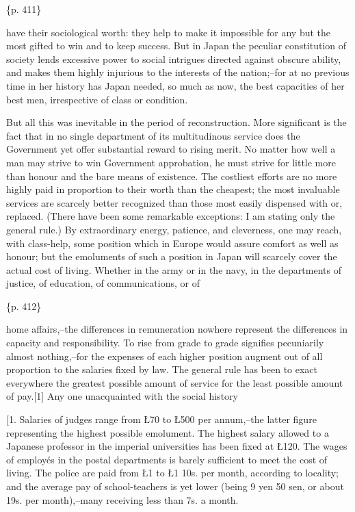 \{p. 411\}

have their sociological worth: they help to make it impossible for any but the most gifted to win and to keep success. But in Japan the peculiar constitution of society lends excessive power to social intrigues directed against obscure ability, and makes them highly injurious to the interests of the nation;--for at no previous time in her history has Japan needed, so much as now, the best capacities of her best men, irrespective of class or condition.

But all this was inevitable in the period of reconstruction. More significant is the fact that in no single department of its multitudinous service does the Government yet offer substantial reward to rising merit. No matter how well a man may strive to win Government approbation, he must strive for little more than honour and the bare means of existence. The costliest efforts are no more highly paid in proportion to their worth than the cheapest; the most invaluable services are scarcely better recognized than those most easily dispensed with or, replaced. (There have been some remarkable exceptions: I am stating only the general rule.) By extraordinary energy, patience, and cleverness, one may reach, with class-help, some position which in Europe would assure comfort as well as honour; but the emoluments of such a position in Japan will scarcely cover the actual cost of living. Whether in the army or in the navy, in the departments of justice, of education, of communications, or of

\{p. 412\}

home affairs,--the differences in remuneration nowhere represent the differences in capacity and responsibility. To rise from grade to grade signifies pecuniarily almost nothing,--for the expenses of each higher position augment out of all proportion to the salaries fixed by law. The general rule has been to exact everywhere the greatest possible amount of service for the least possible amount of pay.[1] Any one unacquainted with the social history

[1. Salaries of judges range from Ł70 to Ł500 per annum,--the latter figure representing the highest possible emolument. The highest salary allowed to a Japanese professor in the imperial universities has been fixed at Ł120. The wages of employés in the postal departments is barely sufficient to meet the cost of living. The police are paid from Ł1 to Ł1 10s. per month, according to locality; and the average pay of school-teachers is yet lower (being 9 yen 50 sen, or about 19s. per month),--many receiving less than 7s. a month.

